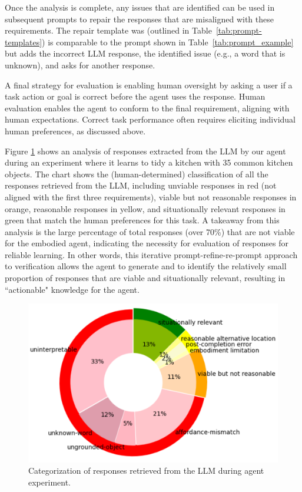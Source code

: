 \documentclass[letterpaper]{article} %
\begin{document}
Once the analysis is complete, any issues that are identified can be used in subsequent prompts to repair the responses that are misaligned with these requirements. The repair template was (outlined in Table~\ref{tab:prompt-templates}) is comparable to the prompt shown in Table~\ref{tab:prompt_example} but adds the incorrect LLM response, the identified issue (e.g., a word that is unknown), and asks for another response.

A final strategy for evaluation is enabling human oversight by asking a user if a task action or goal is correct before the agent uses the response. Human evaluation enables the agent to conform to the final requirement, aligning with human expectations. Correct task performance often requires eliciting individual human preferences, as discussed above.

Figure \ref{fig:response_categories} shows an analysis of responses extracted from the LLM by our agent during an experiment where it learns to tidy a kitchen with 35 common kitchen objects. The chart shows the (human-determined) classification of all the responses retrieved from the LLM, including unviable responses in red (not aligned with the first three requirements), viable but not reasonable responses in orange, reasonable responses in yellow, and situationally relevant responses in green that match the human preferences for this task. A takeaway from this analysis is the large percentage of total responses (over 70\%) that are not viable for the embodied agent, indicating the necessity for evaluation of responses for reliable learning. In other words, this iterative prompt-refine-re-prompt approach to verification allows the agent to generate and to identify the relatively small proportion of responses that are viable and situationally relevant, resulting in ``actionable" knowledge for the agent.

\begin{figure}[t]
    \centering
    \includegraphics[width=1.0\columnwidth]{figures/VerificationTypicalObjectsStandAloneResponseCategoriesSTARSManualCrop.png}
    \caption{Categorization of responses retrieved from the LLM during agent experiment.}
    \label{fig:response_categories}
\end{figure}
\end{document}
